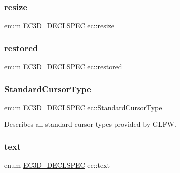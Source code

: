 \mbox{\label{namespaceec_a84e452d7f020435b50e2c18e7cdca968}} 
\subsubsection{\texorpdfstring{resize}{resize}}
{\footnotesize\ttfamily enum \mbox{\hyperlink{_common_8h_aac42573e202ca3dd4d259c81691e2369}{E\+C3\+D\+\_\+\+D\+E\+C\+L\+S\+P\+EC}} ec\+::resize\hspace{0.3cm}{\ttfamily [strong]}}

\mbox{\label{namespaceec_af316093f3fa4161f332a168bd91d598e}} 
\subsubsection{\texorpdfstring{restored}{restored}}
{\footnotesize\ttfamily enum \mbox{\hyperlink{_common_8h_aac42573e202ca3dd4d259c81691e2369}{E\+C3\+D\+\_\+\+D\+E\+C\+L\+S\+P\+EC}} ec\+::restored\hspace{0.3cm}{\ttfamily [strong]}}

\mbox{\label{namespaceec_ab32dc7f72e1021f7625fca2b4693d297}} 
\subsubsection{\texorpdfstring{Standard\+Cursor\+Type}{StandardCursorType}}
{\footnotesize\ttfamily enum \mbox{\hyperlink{_common_8h_aac42573e202ca3dd4d259c81691e2369}{E\+C3\+D\+\_\+\+D\+E\+C\+L\+S\+P\+EC}} ec\+::\+Standard\+Cursor\+Type\hspace{0.3cm}{\ttfamily [strong]}}



Describes all standard cursor types provided by G\+L\+FW. 

\mbox{\label{namespaceec_a0bdee24285d69deca899e166b29c0150}} 
\subsubsection{\texorpdfstring{text}{text}}
{\footnotesize\ttfamily enum \mbox{\hyperlink{_common_8h_aac42573e202ca3dd4d259c81691e2369}{E\+C3\+D\+\_\+\+D\+E\+C\+L\+S\+P\+EC}} ec\+::text\hspace{0.3cm}{\ttfamily [strong]}}

